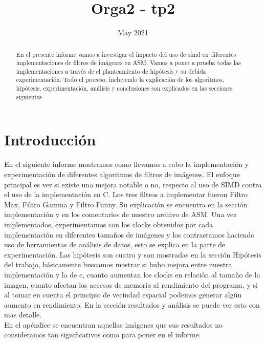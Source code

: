 \documentclass[a4paper]{article}
\title{Orga2 - tp2}
\author{ }
\date{May 2021}
\begin{document}
\thispagestyle{empty}

\maketitle

\newpage

\thispagestyle{empty}
\vfill
\begin{abstract}
En el presente informe vamos a investigar el impacto del uso de simd en diferentes implementaciones de filtros de imágenes en ASM. Vamos a poner a prueba todas las implementaciones a través de el planteamiento de hipótesis y su debida experimentación. Todo el proceso, incluyendo la explicación de los algoritmos, hipótesis, experimentación, análisis y conclusiones son explicados en las secciones siguientes
\end{abstract}

\thispagestyle{empty}
\vspace{3cm}
\tableofcontents
\newpage


\newpage

\section{Introducción}
En el siguiente informe mostramos como llevamos a cabo la implementación y experimentación de diferentes algoritmos de filtros de imágenes. El enfoque principal es ver si existe una mejora notable o no, respecto al uso de SIMD contra el uso de la implementación en C. 
Los tres filtros a implementar fueron Filtro Max, Filtro Gamma y Filtro Funny. Su explicación se encuentra en la sección implementación y en los comentarios de nuestro archivo de ASM.
Una vez implementados, experimentamos con los clocks obtenidos por cada implementación en diferentes tamaños de imágenes y los contrastamos haciendo uso de herramientas de análisis de datos, esto se explica en la parte de experimentación.
Las hipótesis son cuatro y son mostradas en la sección Hipótesis del trabajo, básicamente buscamos mostrar si hubo mejora entre nuestra implementación y la de c, cuanto aumentan los clocks en relación al tamaño de la imagen, cuanto afectan los accesos de memoria al rendimiento del programa, y si al tomar en cuenta el principio de vecindad espacial podemos generar algún aumento en rendimiento. En la sección resultados y análisis se puede ver esto con mas detalle.\\
En el apéndice se encuentran aquellas imágenes que sus resultados no consideramos tan significativos como para poner en el informe.
\end{document}
